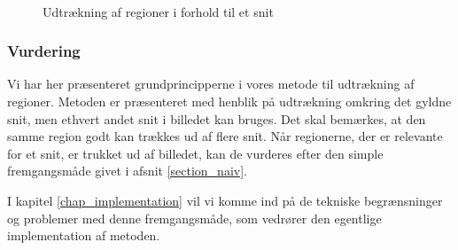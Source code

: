 {\begin{figure}[!p]
{        \label{sammen_floodfill}}\\
    \caption[]{Udtrækning af regioner i forhold til et snit}
    \label{sammensaetning}
\end{figure}

\subsubsection{Vurdering}
Vi har her præsenteret grundprincipperne i vores metode til udtrækning
af regioner. Metoden er præsenteret med henblik på udtrækning omkring
det gyldne snit, men ethvert andet snit i billedet kan bruges. Det skal
bemærkes, at den samme region godt kan trækkes ud af flere snit. Når
regionerne, der er relevante for et snit, er trukket ud af billedet, kan
de vurderes efter den simple fremgangsmåde givet i afsnit
\ref{section_naiv}.

I kapitel \ref{chap_implementation} vil vi komme ind på de tekniske
begrænsninger og problemer med denne fremgangsmåde, som vedrører den
egentlige implementation af metoden.

}

